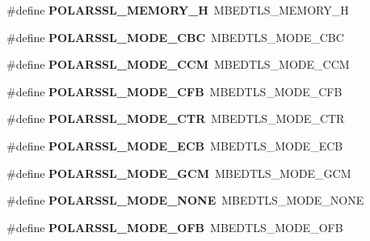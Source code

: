 \begin{DoxyCompactItemize}
\item 
\mbox{\label{compat-1_83_8h_a8fa790063392fc10e7e08efdcad5c804}} 
\#define {\bfseries P\+O\+L\+A\+R\+S\+S\+L\+\_\+\+M\+E\+M\+O\+R\+Y\+\_\+H}~M\+B\+E\+D\+T\+L\+S\+\_\+\+M\+E\+M\+O\+R\+Y\+\_\+H
\item 
\mbox{\label{compat-1_83_8h_a91b6b331824528d9e48d508a52e6de50}} 
\#define {\bfseries P\+O\+L\+A\+R\+S\+S\+L\+\_\+\+M\+O\+D\+E\+\_\+\+C\+BC}~M\+B\+E\+D\+T\+L\+S\+\_\+\+M\+O\+D\+E\+\_\+\+C\+BC
\item 
\mbox{\label{compat-1_83_8h_a90d1a39a3137a07b186d929a84fd9ab2}} 
\#define {\bfseries P\+O\+L\+A\+R\+S\+S\+L\+\_\+\+M\+O\+D\+E\+\_\+\+C\+CM}~M\+B\+E\+D\+T\+L\+S\+\_\+\+M\+O\+D\+E\+\_\+\+C\+CM
\item 
\mbox{\label{compat-1_83_8h_ad95b132ace26144bed97941d91db3ddc}} 
\#define {\bfseries P\+O\+L\+A\+R\+S\+S\+L\+\_\+\+M\+O\+D\+E\+\_\+\+C\+FB}~M\+B\+E\+D\+T\+L\+S\+\_\+\+M\+O\+D\+E\+\_\+\+C\+FB
\item 
\mbox{\label{compat-1_83_8h_a78e1ebbfdecfa9fcb0005e5914c0f263}} 
\#define {\bfseries P\+O\+L\+A\+R\+S\+S\+L\+\_\+\+M\+O\+D\+E\+\_\+\+C\+TR}~M\+B\+E\+D\+T\+L\+S\+\_\+\+M\+O\+D\+E\+\_\+\+C\+TR
\item 
\mbox{\label{compat-1_83_8h_ac554b3838d8396da8656867e3616d036}} 
\#define {\bfseries P\+O\+L\+A\+R\+S\+S\+L\+\_\+\+M\+O\+D\+E\+\_\+\+E\+CB}~M\+B\+E\+D\+T\+L\+S\+\_\+\+M\+O\+D\+E\+\_\+\+E\+CB
\item 
\mbox{\label{compat-1_83_8h_aaf7dfe24812792e42baebfc31fa71e90}} 
\#define {\bfseries P\+O\+L\+A\+R\+S\+S\+L\+\_\+\+M\+O\+D\+E\+\_\+\+G\+CM}~M\+B\+E\+D\+T\+L\+S\+\_\+\+M\+O\+D\+E\+\_\+\+G\+CM
\item 
\mbox{\label{compat-1_83_8h_add447952bd6783ae2cf3423971e5643b}} 
\#define {\bfseries P\+O\+L\+A\+R\+S\+S\+L\+\_\+\+M\+O\+D\+E\+\_\+\+N\+O\+NE}~M\+B\+E\+D\+T\+L\+S\+\_\+\+M\+O\+D\+E\+\_\+\+N\+O\+NE
\item 
\mbox{\label{compat-1_83_8h_a8dc9309372cad93cb78529c10d0c58ac}} 
\#define {\bfseries P\+O\+L\+A\+R\+S\+S\+L\+\_\+\+M\+O\+D\+E\+\_\+\+O\+FB}~M\+B\+E\+D\+T\+L\+S\+\_\+\+M\+O\+D\+E\+\_\+\+O\+FB

\end{DoxyCompactItemize}
